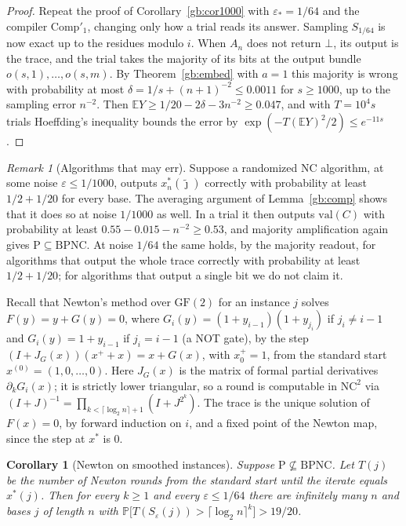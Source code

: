 \documentclass[11pt]{amsart}
\newtheorem{corollary}[theorem]{Corollary}
\theoremstyle{definition}
\theoremstyle{remark}
\newtheorem{remark}[theorem]{Remark}
\newcommand{\eps}{\varepsilon}
\newcommand{\jt}{\tilde{\jmath}}
\newcommand{\val}{\mathrm{val}}
\newcommand{\PP}{\mathbb{P}}
\newcommand{\EE}{\mathbb{E}}
\newcommand{\Comp}{\mathrm{Comp}}
\begin{document}
\begin{proof}
Repeat the proof of Corollary~\ref{gb:cor1000} with $\eps_*=1/64$ and the
compiler $\Comp'_1$, changing only how a trial reads its answer. Sampling
$S_{1/64}$ is now exact up to the residues modulo $i$. When $A_n$ does not
return $\bot$, its output is the trace, and the trial takes the majority of
its bits at the output bundle $o(s,1),\dots,o(s,m)$. By
Theorem~\ref{gb:embed} with $a=1$ this majority is wrong with probability
at most $\delta=1/s+(n+1)^{-2}\le0.0011$ for $s\ge1000$, up to the sampling
error $n^{-2}$. Then $\EE Y\ge1/20-2\delta-3n^{-2}\ge0.047$, and with
$T=10^4s$ trials Hoeffding's inequality bounds the error by
$\exp(-T(\EE Y)^2/2)\le e^{-11s}$.
\end{proof}

\begin{remark}[Algorithms that may err]\label{gb:rem-err}
Suppose a randomized $\mathrm{NC}$ algorithm, at some noise $\eps\le1/1000$,
outputs $x^*_n(\jt)$ correctly with probability at least $1/2+1/20$ for
every base. The averaging argument of Lemma~\ref{gb:comp} shows that it
does so at noise $1/1000$ as well. In a trial it then outputs $\val(C)$ with
probability at least $0.55-0.015-n^{-2}\ge0.53$, and majority amplification
again gives $\mathrm{P}\subseteq\mathrm{BPNC}$. At noise $1/64$ the same
holds, by the majority readout, for algorithms that output the whole trace
correctly with probability at least $1/2+1/20$; for algorithms that output a
single bit we do not claim it.
\end{remark}

Recall that Newton's method over $\mathrm{GF}(2)$ for an instance $j$ solves
$F(y)=y+G(y)=0$, where $G_i(y)=(1+y_{i-1})(1+y_{j_i})$ if $j_i\ne i-1$ and
$G_i(y)=1+y_{i-1}$ if $j_i=i-1$ (a NOT gate), by the step
$(I+J_G(x))(x^++x)=x+G(x)$, with $x^+_0=1$, from the standard start
$x^{(0)}=(1,0,\dots,0)$. Here $J_G(x)$ is the matrix of formal partial
derivatives $\partial_kG_i(x)$; it is strictly lower triangular,
so a round is computable in $\mathrm{NC}^2$ via
$(I+J)^{-1}=\prod_{k<\lceil\log_2 n\rceil+1}(I+J^{2^k})$. The trace is the
unique solution of $F(x)=0$, by forward induction on $i$, and a fixed point
of the Newton map, since the step at $x^*$ is $0$.

\begin{corollary}[Newton on smoothed instances]\label{gb:newton}
Suppose $\mathrm{P}\not\subseteq\mathrm{BPNC}$. Let $T(j)$ be the number of
Newton rounds from the standard start until the iterate equals $x^*(j)$.
Then for every $k\ge1$ and every $\eps\le1/64$ there are infinitely many $n$
and bases $j$ of length $n$ with
$\PP\bigl[T(S_\eps(j))>\lceil\log_2 n\rceil^k\bigr]>19/20$.
\end{corollary}
\end{document}
